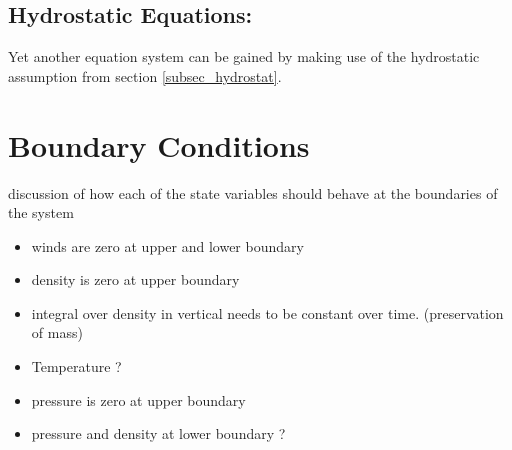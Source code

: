 \subsection{Hydrostatic Equations:}
Yet another equation system can be gained by making use of the hydrostatic assumption from section \ref{subsec_hydrostat}.

\section{Boundary Conditions}
discussion of how each of the state variables should behave at the boundaries of the system
\begin{itemize}
\item winds are zero at upper and lower boundary
\item density is zero at upper boundary
\item integral over density in vertical needs to be constant over time. (preservation of mass)
\item Temperature ?
\item pressure is zero at upper boundary
\item pressure and density at lower boundary ?
\end{itemize}

